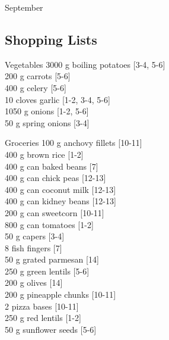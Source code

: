 \begin{menu}{September}
    \subsection*{Shopping Lists}
      \begin{shoppinglist}{Vegetables}
      3000 g boiling potatoes 
        {\scriptsize[3-4, 5-6]}\\
      200 g carrots 
        {\scriptsize[5-6]}\\
      400 g celery 
        {\scriptsize[5-6]}\\
      10 cloves garlic 
        {\scriptsize[1-2, 3-4, 5-6]}\\
      1050 g onions 
        {\scriptsize[1-2, 5-6]}\\
      50 g spring onions 
        {\scriptsize[3-4]}\\
      \end{shoppinglist}%
      \begin{shoppinglist}{Groceries}
      100 g anchovy fillets 
        {\scriptsize[10-11]}\\
      400 g brown rice 
        {\scriptsize[1-2]}\\
      400 g can baked beans 
        {\scriptsize[7]}\\
      400 g can chick peas 
        {\scriptsize[12-13]}\\
      400 g can coconut milk 
        {\scriptsize[12-13]}\\
      400 g can kidney beans 
        {\scriptsize[12-13]}\\
      200 g can sweetcorn 
        {\scriptsize[10-11]}\\
      800 g can tomatoes 
        {\scriptsize[1-2]}\\
      50 g capers 
        {\scriptsize[3-4]}\\
      8  fish fingers 
        {\scriptsize[7]}\\
      50 g grated parmesan 
        {\scriptsize[14]}\\
      250 g green lentils 
        {\scriptsize[5-6]}\\
      200 g olives 
        {\scriptsize[14]}\\
      200 g pineapple chunks 
        {\scriptsize[10-11]}\\
      2  pizza bases 
        {\scriptsize[10-11]}\\
      250 g red lentils 
        {\scriptsize[1-2]}\\
      50 g sunflower seeds 
        {\scriptsize[5-6]}\\

\end{shoppinglist}
\end{menu}
